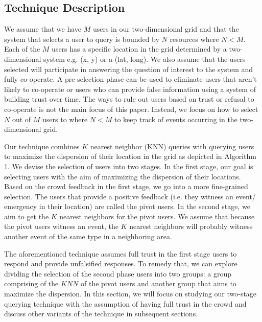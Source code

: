 \documentclass{acm_proc_article-sp}
\begin{document}
\subsection{Technique Description}
We assume that we have $M$ users in our two-dimensional grid and that the system that selects a user to query is bounded by $N$ resources where $N < M$.  Each of the $M$ users has a specific location in the grid determined by a two-dimensional system e.g. (x, y) or a (lat, long). We also assume that the users selected will participate in answering the question of interest to the system and fully co-operate. A pre-selection phase can be used to eliminate users that aren't likely to co-operate or users who can provide false information using a system of building trust over time. The ways to rule out users based on trust or refusal to co-operate is not the main focus of this paper. Instead, we focus on how to select $N$ out of $M$ users to  where $N < M$ to keep track of events occurring in the two-dimensional grid.\par
Our technique combines $K$ nearest neighbor (KNN) queries with querying users to maximize the dispersion of their location in the grid as depicted in Algorithm 1. We devise the selection of users into two stages. In the first stage, our goal is selecting users with the aim of maximizing the dispersion of their locations. Based on the crowd feedback in the first stage, we go into a more fine-grained selection. The users that provide a positive feedback (i.e. they witness an event/ emergency in their location) are called the pivot users. In the second stage, we aim to get the $K$ nearest neighbors for the pivot users. We assume that because the pivot users witness an event, the $K$ nearest neighbors will probably witness another event of the same type in a neighboring area. \par
The aforementioned technique assumes full trust in the first stage users to respond and provide unfalsified responses. To remedy that, we can explore dividing the selection of the second phase users into two groups: a group comprising of the $KNN$ of the pivot users and another group that aims to maximize the dispersion. In this section, we will focus on studying our two-stage querying technique with the assumption of having full trust in the crowd and discuss other variants of the technique in subsequent sections.\par 
\end{document}
